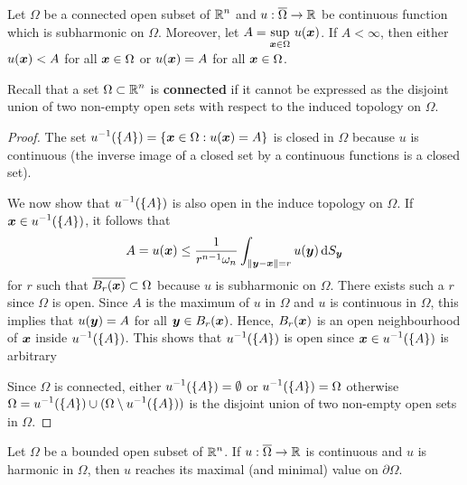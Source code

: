 \begin{theorem} \label{laplace_HMP}
Let $\Omega$ be a connected open subset of $\displaystyle \mathbb{R}^n$ and
$u:\overline{\Omega}\rightarrow \mathbb{R}$ be continuous function which is
subharmonic on $\Omega$.  Moreover, let 
$\displaystyle A = \sup_{{\bm{x}}\in \Omega}\, u({\bm{x}})$.
If $A<\infty$, then either $u({\bm{x}}) < A$ for all ${\bm{x}} \in \Omega$ or
$u({\bm{x}}) = A$ for all ${\bm{x}} \in \Omega$.
\end{theorem}

\begin{rmk}
Recall that a set $\displaystyle \Omega \subset \mathbb{R}^n$ is
{\bfseries connected} if it cannot be
expressed as the disjoint union of two non-empty open sets with
respect to the induced topology on $\Omega$.
\end{rmk}

\begin{proof}
The set
$\displaystyle u^{-1}(\{A\})
= \left\{ {\bm{x}}\in \Omega : u({\bm{x}}) = A \right\}$
is closed in $\Omega$ because $u$ is continuous (the inverse image of a
closed set by a continuous functions is a closed set).

We now show that $\displaystyle u^{-1}(\{A\})$ is also open in the
induce topology on $\Omega$.  If
$\displaystyle {\bm{x}} \in u^{-1}(\{A\})$, it follows that
\[
A = u({\bm{x}}) \leq \frac{1}{r^{n-1}\omega_n} \int_{\|{\bm{y}}-{\bm{x}}\|=r}
u({\bm{y}}) \,\mathrm{d}{S}_{{\bm{y}}}
\]
for $r$ such that $\overline{B_r({\bm{x}})}\subset \Omega$ because
$u$ is subharmonic on $\Omega$.  There exists such a $r$ since $\Omega$ is
open.  Since $A$ is the maximum of $u$ in $\Omega$ and $u$ is continuous in
$\Omega$, this implies that $u({\bm{y}}) = A$ for all
${\bm{y}} \in B_r({\bm{x}})$.  Hence, $B_r({\bm{x}})$ is an open
neighbourhood of ${\bm{x}}$ inside $\displaystyle u^{-1}(\{A\})$.
This shows that $\displaystyle u^{-1}(\{A\})$ is open since
$\displaystyle {\bm{x}} \in u^{-1}(\{A\})$ is arbitrary

Since $\Omega$ is connected, either
$\displaystyle u^{-1}(\{A\}) = \emptyset$ or
$\displaystyle u^{-1}(\{A\}) = \Omega$ otherwise
$\displaystyle \Omega = u^{-1}(\{A\}) \cup
(\Omega \setminus u^{-1}(\{A\}))$ is the disjoint
union of two non-empty open sets in $\Omega$.
\end{proof}

\begin{cor} \label{laplace_cHMP}
Let $\Omega$ be a bounded open subset of $\displaystyle \mathbb{R}^n$.  If
$u:\overline{\Omega} \rightarrow \mathbb{R}$ is continuous and $u$ is
harmonic in $\Omega$, then $u$ reaches its maximal (and minimal) value
on $\partial \Omega$.
\end{cor}

